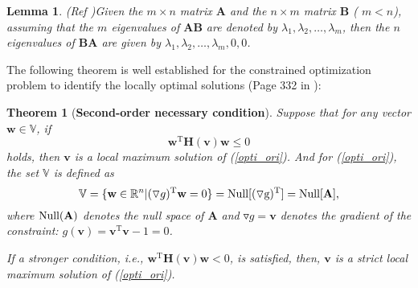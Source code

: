 \documentclass{elsarticle}
\newtheorem{theorem}{\textbf{ Theorem} }
\newtheorem{lemma}{\textbf{Lemma } }
\begin{document}
\begin{lemma}(Ref \cite{zhang2017matrix})\label{AB_BA_eig}
Given  
the    $ m \times n$    matrix  
$\mathbf A$
and   the   $n \times m$   matrix  
$\mathbf B$ ( $m < n $),
assuming  that 
the $m$ eigenvalues of 
$ 	\mathbf A
\mathbf B $
are  denoted  by 
$
\lambda_{1}, \lambda_{2},  \dots, \lambda_{m}$,
then  the $n$  eigenvalues  of  
$ 	\mathbf  B
\mathbf A $
are  given  by 
$
\lambda_{1}, \lambda_{2},  \dots, \lambda_{m}, 
0, 0$.
\end{lemma}


The  following  theorem is  well  established     for   the   constrained  optimization  problem   to  identify  the  locally  optimal   solutions
(Page 332 in    \cite{Numerical}): 

\begin{theorem}[\textbf{Second-order necessary condition}]\label{second_order_necessary}\cite{Numerical}
	Suppose that
	for any  vector $ \mathbf w \in \mathbb V $,
	if 
	\begin{equation}\label{second_order}
	\mathbf w^{\mathrm T}
	\mathbf H (\mathbf v) 
	\mathbf w  
	\le 0   
	\end{equation}
	holds, then
	$\mathbf v $
	is a local maximum solution of (\ref{opti_ori}).
	And for  (\ref{opti_ori}), the set
	$\mathbb V $
	is defined as
	\begin{equation}\label{vdefine}
	\mathbb V=\{
	\mathbf w \in \mathbb R^{n}
	\vert   (\triangledown  g)^{\mathrm T} \mathbf w   =0
	\}=
	\rm Null [(\triangledown  g)^{\mathrm T} ]
	=
		\rm Null [\mathbf A ],
	\end{equation}
	where   $ \rm Null( \mathbf A) $ 
	denotes the null space  of $\mathbf A$  and $  \triangledown  g =\mathbf v $  denotes the gradient of the constraint: $ g (\mathbf v) = 
	\mathbf v^{\mathrm T}
	\mathbf v 
	-1
	=0 $.  
	
	If a stronger condition, i.e.,
	$ \mathbf w^{\mathrm T}
	\mathbf H (\mathbf v) 
	\mathbf w  <   0 $,   %
	is satisfied, then,  
	$\mathbf v$
	is a   strict     local maximum  solution of (\ref{opti_ori}).
\end{theorem}
\end{document}
